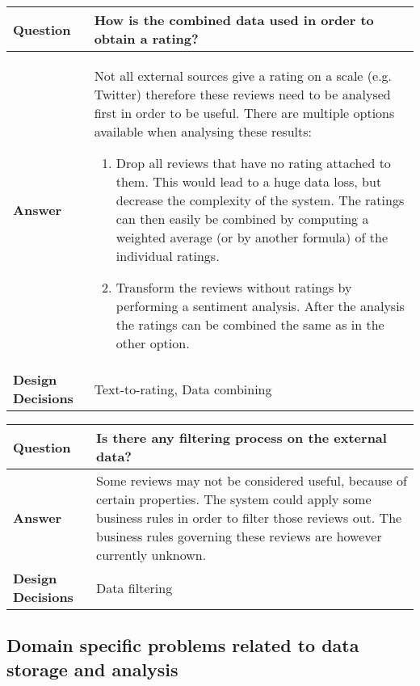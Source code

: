 \begin{longtable}{| l |  p{12cm} |}
\hline
\textbf{Question} & \textbf{How is the combined data used in order to obtain a rating?} \\ \hline
\textbf{Answer} &
	Not all external sources give a rating on a scale (e.g. Twitter) therefore these reviews need to be analysed first in order to be useful. There are multiple options available when analysing these results:
	\begin{enumerate}
	\item Drop all reviews that have no rating attached to them. This would lead to a huge data loss, but decrease the complexity 			of the system. The ratings can then easily be combined by computing a weighted average (or by another formula) of the individual ratings.	
	\item Transform the reviews without ratings by performing a sentiment analysis. After the analysis the ratings can be combined the same as in the other option.
\end{enumerate} \\ \hline
\textbf{Design Decisions} & Text-to-rating, Data combining \\ \hline
\end{longtable}

\begin{longtable}{| l |  p{12cm} |}
\hline
\textbf{Question} & \textbf{Is there any filtering process on the external data?} \\ \hline
\textbf{Answer} &
	Some reviews may not be considered useful, because of certain properties. The system could apply some business rules in order to filter those reviews out. The business rules governing these reviews are however currently unknown. \\ \hline
\textbf{Design Decisions} & Data filtering \\ \hline
\end{longtable}


\subsection{Domain specific problems related to data storage and analysis}

